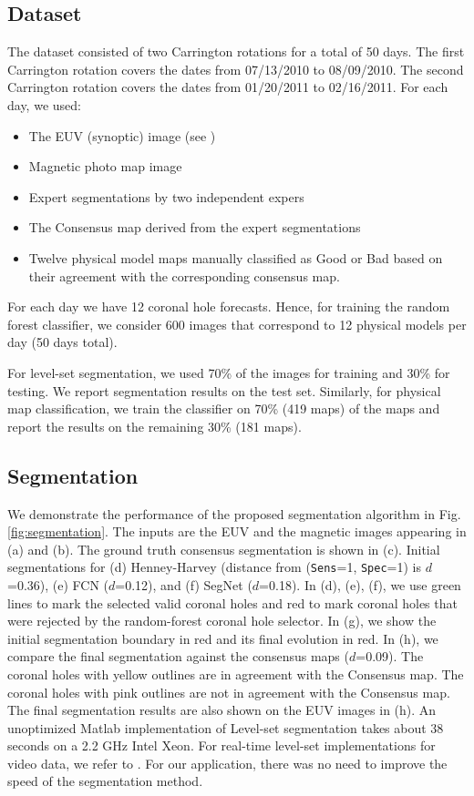 \documentclass[journal]{IEEEtran}
\begin{document}
\subsection{Dataset}\label{sec:ground_truth}
The dataset consisted of two Carrington rotations \cite{howard1981surface}
for a total of 50 days. The first Carrington rotation covers the dates 
from 07/13/2010 to 08/09/2010. The second Carrington rotation covers the
dates from 01/20/2011 to 02/16/2011. For each day, we used:
\begin{itemize}
        \item The EUV (synoptic) image (see \cite{altschuler1977high})
        \item Magnetic photo map image
        \item Expert segmentations by two independent expers
        \item The Consensus map derived from the expert segmentations
        \item Twelve physical model maps manually classified as Good or Bad
               based on their agreement with the corresponding consensus map.
\end{itemize}
For each day we have 12 coronal hole forecasts. 
Hence, for training the random forest classifier, we
consider 600 images that correspond to 12 physical models per day (50 days total).

\color{blue}
For level-set segmentation, we used 70\% of the images for training
    and 30\% for testing.    
We report segmentation results on the test set.
Similarly, for physical map classification, we    
   train the classifier on 70\% (419 maps) of the maps and report the 
   results on the remaining 30\% (181 maps).
\color{blue}

\color{blue}
\subsection{Segmentation}\label{sec:segm}
We demonstrate the performance of the proposed segmentation algorithm 
   in Fig. \ref{fig:segmentation}.
The inputs are the EUV and the magnetic images appearing in 
   (a) and (b).
The ground truth consensus segmentation is shown in (c).
Initial segmentations for
  (d) Henney-Harvey (distance from ({\tt Sens}=1, {\tt Spec}=1) is $d$=0.36), 
  (e) FCN ($d$=0.12), and 
  (f) SegNet ($d$=0.18).
In (d), (e), (f), 
  we use green lines to mark the selected valid coronal holes and
  red to mark coronal holes that were rejected by the random-forest
  coronal hole selector.  
In (g), we show the initial segmentation boundary in red and its final
  evolution in red.
In (h), we compare the final segmentation against the consensus maps ($d$=0.09).
The coronal holes with yellow outlines are in agreement with the Consensus map.
The coronal holes with pink outlines are not in agreement with the Consensus map.
The final segmentation results are also shown on the EUV images in (h).
An unoptimized Matlab implementation of Level-set segmentation takes about 38 seconds
   on a 2.2 GHz Intel Xeon.
For real-time level-set implementations for video data, we refer to \cite{FastLevel}.
For our application, there was no need to improve the speed of the segmentation method.
\end{document}
